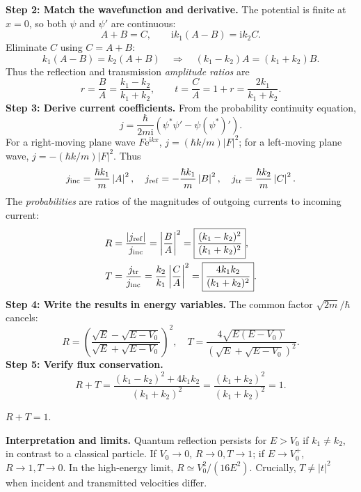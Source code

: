 \documentclass[11pt,a4paper]{article}
\newcommand{\key}[1]{\begin{resultbox}\centering\(\displaystyle #1\)\end{resultbox}}
\newcommand{\iu}{\mathrm{i}}
\newcommand{\ee}{\mathrm{e}}
\newcommand{\abs}[1]{\left|#1\right|}
\begin{document}
\textbf{Step 2: Match the wavefunction and derivative.} The potential is finite at $x=0$, so both $\psi$ and $\psi'$ are continuous:
\begin{equation}
A+B=C,\qquad \iu k_1(A-B)=\iu k_2C.
\end{equation}
Eliminate $C$ using $C=A+B$:
\begin{equation}
k_1(A-B)=k_2(A+B)\quad\Longrightarrow\quad(k_1-k_2)A=(k_1+k_2)B.
\end{equation}
Thus the reflection and transmission \emph{amplitude ratios} are
\begin{equation}
\boxed{r=\frac BA=\frac{k_1-k_2}{k_1+k_2},\qquad t=\frac CA=1+r=\frac{2k_1}{k_1+k_2}.}
\end{equation}
\textbf{Step 3: Derive current coefficients.} From the probability continuity equation,
\begin{equation}\label{eq:current}
j=\frac{\hbar}{2m\iu}\left(\psi^*\psi'-\psi(\psi^*)'\right).
\end{equation}
For a right-moving plane wave $F\ee^{\iu kx}$, $j=(\hbar k/m)\abs F^2$; for a left-moving plane wave, $j=-(\hbar k/m)\abs F^2$. Thus
\begin{equation}
j_{\rm inc}=\frac{\hbar k_1}{m}\abs A^2,\quad
j_{\rm ref}=-\frac{\hbar k_1}{m}\abs B^2,\quad
j_{\rm tr}=\frac{\hbar k_2}{m}\abs C^2.
\end{equation}
The \emph{probabilities} are ratios of the magnitudes of outgoing currents to incoming current:
\begin{align}
R&=\frac{\abs{j_{\rm ref}}}{j_{\rm inc}}=\abs{\frac BA}^2=\boxed{\frac{(k_1-k_2)^2}{(k_1+k_2)^2}},\\
T&=\frac{j_{\rm tr}}{j_{\rm inc}}=\frac{k_2}{k_1}\abs{\frac CA}^2=\boxed{\frac{4k_1k_2}{(k_1+k_2)^2}}.
\end{align}
\textbf{Step 4: Write the results in energy variables.} The common factor $\sqrt{2m}/\hbar$ cancels:
\begin{equation}
\boxed{R=\left(\frac{\sqrt E-\sqrt{E-V_0}}{\sqrt E+\sqrt{E-V_0}}\right)^2,\quad
T=\frac{4\sqrt{E(E-V_0)}}{(\sqrt E+\sqrt{E-V_0})^2}.}
\end{equation}
\textbf{Step 5: Verify flux conservation.}
\begin{equation}
R+T=\frac{(k_1-k_2)^2+4k_1k_2}{(k_1+k_2)^2}=\frac{(k_1+k_2)^2}{(k_1+k_2)^2}=1.
\end{equation}
\key{\boxed{R+T=1.}}
\textbf{Interpretation and limits.} Quantum reflection persists for $E>V_0$ if $k_1\ne k_2$, in contrast to a classical particle. If $V_0\to0$, $R\to0,T\to1$; if $E\to V_0^+$, $R\to1,T\to0$. In the high-energy limit, $R\simeq V_0^2/(16E^2)$. Crucially, $T\ne\abs t^2$ when incident and transmitted velocities differ.
\end{document}
